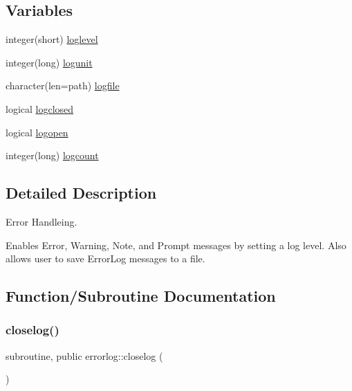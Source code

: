 \subsection*{Variables}
\begin{DoxyCompactItemize}
\item 
integer(short) \hyperlink{namespaceerrorlog_a3ab7fc512e499660dcb9a9542aab02b5}{loglevel}
\item 
integer(long) \hyperlink{namespaceerrorlog_adb26bb2d10f764e895c9745c3fb5dd1d}{logunit}
\item 
character(len=path) \hyperlink{namespaceerrorlog_a42e82497abf38d3e1683b51b48a5e4c0}{logfile}
\item 
logical \hyperlink{namespaceerrorlog_af9add736038cc71b13ee19df6544f3e5}{logclosed}
\item 
logical \hyperlink{namespaceerrorlog_a3a12f9c3cbb079a8cbb7b5790ea2c827}{logopen}
\item 
integer(long) \hyperlink{namespaceerrorlog_a056ccc9457985050fb6391dd4abf1f2c}{logcount}
\end{DoxyCompactItemize}


\subsection{Detailed Description}
Error Handleing. 

Enables Error, Warning, Note, and Prompt messages by setting a log level. Also allows user to save Error\+Log messages to a file. 

\subsection{Function/\+Subroutine Documentation}
\mbox{\label{namespaceerrorlog_af9219c790b58905faca7f5695515325d}} 
\subsubsection{\texorpdfstring{closelog()}{closelog()}}
{\footnotesize\ttfamily subroutine, public errorlog\+::closelog (\begin{DoxyParamCaption}{ }\end{DoxyParamCaption})}

